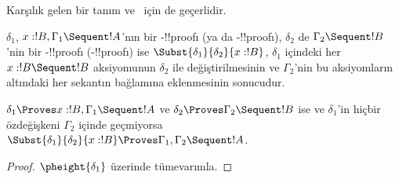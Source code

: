 Karşılık gelen bir tanım  ve~ için de geçerlidir.

\begin{defn}
$\delta_1$, $x:!B, \Gamma_1 \Sequent !A$'nın bir -!!{proof}{}ı
(ya da -!!{proof}{}ı), $\delta_2$ de $\Gamma_2 \Sequent !B$'nin bir
-!!{proof}{}ı (-!!{proof}{}ı) ise
$\Subst{\delta_1}{\delta_2}{x:!B}$, $\delta_1$ içindeki her
$x:!B \Sequent !B$ aksiyomunun $\delta_2$ ile değiştirilmesinin ve
$\Gamma_2$'nin bu aksiyomların altındaki her sekantın bağlamına eklenmesinin
sonucudur.
\end{defn}

\begin{prop}
$\delta_1 \Proves x:!B, \Gamma_1 \Sequent !A$ ve
$\delta_2 \Proves \Gamma_2 \Sequent !B$ ise ve $\delta_1$'in hiçbir
özdeğişkeni $\Gamma_2$ içinde geçmiyorsa
$\Subst{\delta_1}{\delta_2}{x:!B} \Proves \Gamma_1, \Gamma_2 \Sequent !A$.
\end{prop}


\begin{proof}
  $\pheight{\delta_1}$ üzerinde tümevarımla.
\end{proof}

